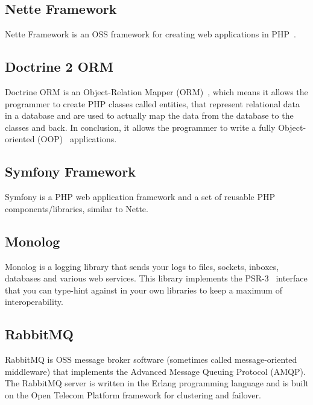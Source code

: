 \subsection{Nette Framework} \label{sec:theory:nette}

Nette Framework is an OSS framework for creating web applications in PHP~\cite{wiki:nette}.

\subsection{Doctrine 2 ORM} \label{sec:theory:doctrine}

Doctrine ORM is an Object-Relation Mapper (ORM)~\cite{wiki:orm}, which means it allows the programmer to create PHP classes called entities, that represent relational data in a database and are used to actually map the data from the database to the classes and back. In conclusion, it allows the programmer to write a fully Object-oriented (OOP)~\cite{wiki:oop} applications.

\subsection{Symfony Framework} \label{sec:theory:symfony}

Symfony is a PHP web application framework and a set of reusable PHP components/libraries, similar to Nette.~\cite{wiki:symfony}

\subsection{Monolog} \label{sec:theory:monolog}

Monolog is a logging library that sends your logs to files, sockets, inboxes, databases and various web services. This library implements the PSR-3~\cite{fig:psr} interface that you can type-hint against in your own libraries to keep a maximum of interoperability.~\cite{monolog:readme}

\subsection{RabbitMQ} \label{sec:theory:rabbitmq}

RabbitMQ is OSS message broker software (sometimes called message-oriented middleware) that implements the Advanced Message Queuing Protocol (AMQP). The RabbitMQ server is written in the Erlang programming language and is built on the Open Telecom Platform framework for clustering and failover.~\cite{wiki:rabbitmq}

